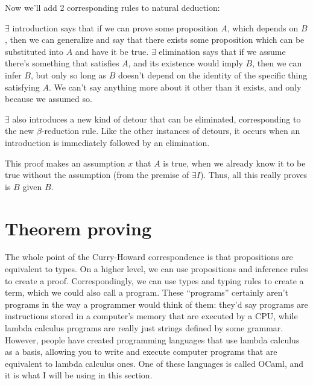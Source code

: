 \documentclass[12pt]{article}
\begin{document}
Now we'll add 2 corresponding rules to natural deduction:

\begin{prooftree}
\end{prooftree}

\begin{prooftree}
\end{prooftree}

$\exists$ introduction says that if we can prove some proposition $A$, which depends on $B$, then we can generalize and say that there exists some proposition which can be substituted into $A$ and have it be true. $\exists$ elimination says that if we assume there's something that satisfies $A$, and its existence would imply $B$, then we can infer $B$, but only so long as $B$ doesn't depend on the identity of the specific thing satisfying $A$. We can't say anything more about it other than it exists, and only because we assumed so.

$\exists$ also introduces a new kind of detour that can be eliminated, corresponding to the new $\beta$-reduction rule. Like the other instances of detours, it occurs when an introduction is immediately followed by an elimination.

\begin{prooftree}
\end{prooftree}

This proof makes an assumption $x$ that $A$ is true, when we already know it to be true without the assumption (from the premise of $\exists I$). Thus, all this really proves is $B$ given $B$.

\section{Theorem proving}

The whole point of the Curry-Howard correspondence is that propositions are equivalent to types. On a higher level, we can use propositions and inference rules to create a proof. Correspondingly, we can use types and typing rules to create a term, which we could also call a program. These ``programs'' certainly aren't programs in the way a programmer would think of them: they'd say programs are instructions stored in a computer's memory that are executed by a CPU, while lambda calculus programs are really just strings defined by some grammar. However, people have created programming languages that use lambda calculus as a basis, allowing you to write and execute computer programs that are equivalent to lambda calculus ones. One of these languages is called OCaml, and it is what I will be using in this section.
\end{document}

